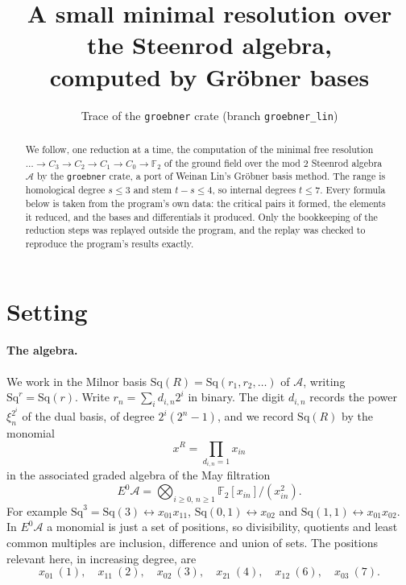 \documentclass[11pt]{article}
\title{A small minimal resolution over the Steenrod algebra,\\ computed by Gröbner bases}
\author{Trace of the \texttt{groebner} crate (branch \texttt{groebner\_lin})}
\date{}
\newcommand{\Sq}{\mathrm{Sq}}
\newcommand{\F}{\mathbb{F}_2}
\newcommand{\A}{\mathcal{A}}
\begin{document}
\maketitle

\begin{abstract}
We follow, one reduction at a time, the computation of the minimal free resolution
$\dots \to C_3 \to C_2 \to C_1 \to C_0 \to \F$ of the ground field over the mod $2$ Steenrod
algebra $\A$ by the \texttt{groebner} crate, a port of Weinan Lin's Gröbner basis method. The
range is homological degree $s \le 3$ and stem $t - s \le 4$, so internal degrees $t \le 7$.
Every formula below is taken from the program's own data: the critical pairs it formed, the
elements it reduced, and the bases and differentials it produced. Only the bookkeeping of the
reduction steps was replayed outside the program, and the replay was checked to reproduce the
program's results exactly.
\end{abstract}

\section{Setting}

\paragraph{The algebra.}
We work in the Milnor basis $\Sq(R) = \Sq(r_1, r_2, \dots)$ of $\A$, writing $\Sq^r = \Sq(r)$.
Write $r_n = \sum_i d_{i,n} 2^i$ in binary. The digit $d_{i,n}$ records the power
$\xi_n^{2^i}$ of the dual basis, of degree $2^i(2^n - 1)$, and we record $\Sq(R)$ by the
monomial
\[ x^R = \prod_{d_{i,n} = 1} x_{in} \]
in the associated graded algebra of the May filtration
\[ E^0\A = \bigotimes_{i \ge 0,\, n \ge 1} \F[x_{in}]/(x_{in}^2). \]
For example $\Sq^3 = \Sq(3) \leftrightarrow x_{01}x_{11}$, $\Sq(0,1) \leftrightarrow x_{02}$ and
$\Sq(1,1) \leftrightarrow x_{01}x_{02}$. In $E^0\A$ a monomial is just a set of positions, so
divisibility, quotients and least common multiples are inclusion, difference and union of sets.
The positions relevant here, in increasing degree, are
\[ x_{01}\ (1),\quad x_{11}\ (2),\quad x_{02}\ (3),\quad x_{21}\ (4),\quad x_{12}\ (6),\quad x_{03}\ (7). \]
\end{document}
